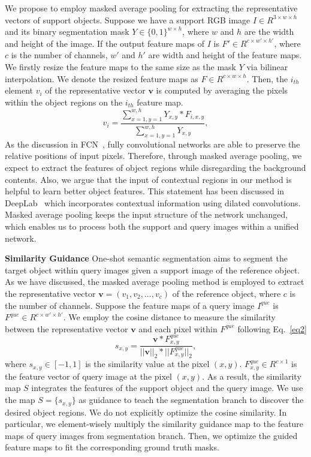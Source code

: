 \documentclass[journal]{IEEEtran}
\begin{document}
We propose to employ masked average pooling for extracting the representative vectors of support objects.
Suppose we have a support RGB image $I\in R^{3\times w \times h}$ and its binary segmentation mask $Y \in \{0,1\}^{w\times h}$, where $w$ and $h$ are the width and height of the image.
If the output feature maps of $I$ is $F'\in R^{c\times w' \times h'}$, where $c$ is the number of channels, $w'$ and $h'$ are width and height of the feature maps.
We firstly resize the feature maps to the same size as the mask $Y$ via bilinear interpolation.
We denote the resized feature maps as $F\in R^{c\times w \times h}$.
Then, the $i_{th}$ element $v_{i}$ of the representative vector $\mathbf{v}$ is computed by averaging the pixels within the object regions on the $i_{th}$ feature map.
\begin{equation}\label{eq1}
v_i = \frac{\sum_{x=1,y=1}^{w,h} Y_{x,y}*F_{i,x,y}}{\sum_{x=1,y=1}^{w,h} Y_{x,y}},
\end{equation}
As the discussion in FCN~\cite{2015-long}, fully convolutional networks are able to preserve the relative positions of input pixels.
Therefore, through masked average pooling, we expect to extract the features of object regions while disregarding the background contents.
Also, we argue that the input of contextual regions in our method is helpful to learn better object features.
This statement has been discussed in DeepLab~\cite{chen2014semantic} which incorporates contextual information using dilated convolutions.
Masked average pooling keeps the input structure of the network unchanged, which enables us to process both the support and query images within a unified network.

\noindent \textbf{Similarity Guidance}
One-shot semantic segmentation aims to segment the target object within query images given a support image of the reference object.
As we have discussed, the masked average pooling method is employed to extract the representative vector $\mathbf{v}=(v_1,v_2,...,v_c)$ of the reference object, where $c$ is the number of channels.
Suppose the feature maps of a query image $I^{que}$ is $F^{que}\in R^{c\times w' \times h'}$.
We employ the cosine distance to measure the similarity between the representative vector $\mathbf{v}$ and each pixel within $F^{que}$ following Eq.~\eqref{eq2}
\begin{equation}\label{eq2}
s_{x,y} = \frac{\mathbf{v}* F^{que}_{x,y}}{||\mathbf{v}||_2 * ||F^{que}_{x,y}||_2},
\end{equation}
where $s_{x,y} \in [-1,1]$ is the similarity value at the pixel $(x,y)$.
$F^{que}_{x,y} \in R^{c\times 1}$ is the feature vector of query image at the pixel $(x,y)$.
As a result, the similarity map $S$ integrates the features of the support object and the query image.
We use the map $S=\{s_{x,y}\}$ as guidance to teach the segmentation branch to discover the desired object regions.
We do not explicitly optimize the cosine similarity. 
In particular, we element-wisely multiply the similarity guidance map to the feature maps of query images from segmentation branch.
Then, we optimize the guided feature maps to fit the corresponding ground truth masks.
\end{document}
